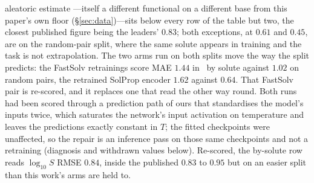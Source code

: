 aleatoric estimate \cite{osanloo2024}---itself a different functional on a different base from this
paper's own floor (\S\ref{sec:data})---sits below every row of the table but two, the closest
published figure being the leaders' $0.83$; both exceptions, at $0.61$ and $0.45$, are on the
random-pair split, where the same solute appears in training and the task is not extrapolation. The
two arms run on both splits move the way the split predicts: the FastSolv retrainings score MAE
$1.44$ in \lnx\ by solute against $1.02$ on random pairs, the retrained SolProp encoder $1.62$
against $0.64$. That FastSolv pair is re-scored, and it replaces one that read the other way round.
Both runs had been scored through a prediction path of ours that standardises the model's inputs
twice, which saturates the network's input activation on temperature and leaves the predictions
exactly constant in $T$; the fitted checkpoints were unaffected, so the repair is an inference pass
on those same checkpoints and not a retraining (diagnosis and withdrawn values below). Re-scored, the by-solute
row reads $\log_{10}S$ RMSE $0.84$, inside the published $0.83$ to $0.95$ but on an easier split than
this work's arms are held to.

